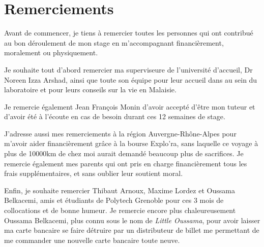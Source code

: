 \chapter*{Remerciements}

Avant de commencer, je tiens à remercier toutes les personnes qui ont contribué au bon déroulement de mon stage en m'accompagnant financièrement, moralement ou physiquement.

Je souhaite tout d'abord remercier ma superviseure de l'université d'accueil, Dr Noreen Izza Arshad, ainsi que toute son équipe pour leur accueil dans au sein du laboratoire et pour leurs conseils sur la vie en Malaisie.

Je remercie également Jean François Monin d'avoir accepté d'être mon tuteur et d'avoir été à l'écoute en cas de besoin durant ces 12 semaines de stage.

J'adresse aussi mes remerciements à la région Auvergne-Rhône-Alpes pour m'avoir aider financièrement grâce à la bourse Explo'ra, sans laquelle ce voyage à plus de 10000km de chez moi aurait demandé beaucoup plus de sacrifices. Je remercie également mes parents qui ont pris en charge financièrement tous les frais supplémentaires, et sans oublier leur soutient moral.

Enfin, je souhaite remercier Thibaut Arnoux, Maxime Lordez et Oussama Belkacemi, amis et étudiants de Polytech Grenoble pour ces 3 mois de collocations et de bonne humeur. Je remercie encore plus chaleureusement Oussama Belkacemi, plus connu sous le nom de \textit{Little Oussama}, pour avoir laisser ma carte bancaire se faire détruire par un distributeur de billet me permettant de me commander une nouvelle carte bancaire toute neuve.
